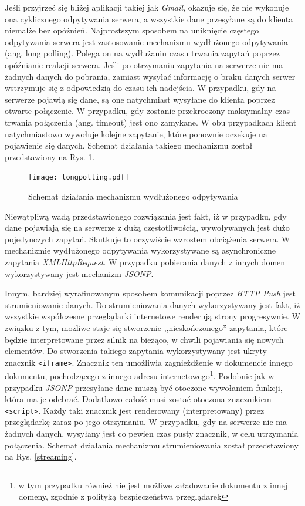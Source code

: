 \documentclass[a4paper,12pt]{article}
\providecommand{\imref}[1]{Rys. \ref{#1}} %
\begin{document}
Jeśli przyjrzeć się bliżej aplikacji takiej jak \emph{Gmail}, okazuje
się, że nie wykonuje ona cyklicznego odpytywania serwera, a wszystkie
dane przesyłane są do klienta niemalże bez opóźnień. Najprostszym
sposobem na uniknięcie częstego odpytywania serwera jest zastosowanie
mechanizmu wydłużonego odpytywania (ang. long polling). Polega on na
wydłużaniu czasu trwania zapytań poprzez opóźnianie reakcji
serwera. Jeśli po otrzymaniu zapytania na serwerze nie ma żadnych
danych do pobrania, zamiast wysyłać informację o braku danych serwer
wstrzymuje się z odpowiedzią do czasu ich nadejścia. W przypadku, gdy
na serwerze pojawią się dane, są one natychmiast wysyłane do klienta
poprzez otwarte połączenie. W przypadku, gdy zostanie przekroczony
maksymalny czas trwania połączenia (ang. timeout) jest ono zamykane. W
obu przypadkach klient natychmiastowo wywołuje kolejne zapytanie,
które ponownie oczekuje na pojawienie się danych. Schemat działania
takiego mechanizmu został przedstawiony na \imref{longpolling}.

\begin{figure}[ht]
  \begin{center}
    \texttt{[image: longpolling.pdf]}
  \end{center}
  \caption{Schemat działania mechanizmu wydłużonego odpytywania}
  \label{longpolling}
\end{figure}

Niewątpliwą wadą przedstawionego rozwiązania jest fakt, iż w
przypadku, gdy dane pojawiają się na serwerze z dużą częstotliwością,
wywoływanych jest dużo pojedynczych zapytań. Skutkuje to oczywiście
wzrostem obciążenia serwera. W mechanizmie wydłużonego odpytywania
wykorzystywane są asynchroniczne zapytania \emph{XMLHttpRequest}. W
przypadku pobierania danych z innych domen wykorzystywany jest
mechanizm \emph{JSONP}.

Innym, bardziej wyrafinowanym sposobem komunikacji poprzez \emph{HTTP
  Push} jest strumieniowanie danych. Do strumieniowania danych
wykorzystywany jest fakt, iż wszystkie współczesne przeglądarki
internetowe renderują strony progresywnie. W związku z tym, możliwe
staje się stworzenie ,,nieskończonego'' zapytania, które będzie
interpretowane przez silnik na bieżąco, w chwili pojawiania się nowych
elementów. Do stworzenia takiego zapytania wykorzystywany jest ukryty
znacznik \texttt{<iframe>}. Znacznik ten umożliwia zagnieżdżenie w
dokumencie innego dokumentu, pochodzącego z innego adresu
internetowego\footnote{w tym przypadku również nie jest możliwe
  załadowanie dokumentu z innej domeny, zgodnie z polityką
  bezpieczeństwa przeglądarek}. Podobnie jak w przypadku \emph{JSONP}
przesyłane dane muszą być otoczone wywołaniem funkcji, która ma je
odebrać. Dodatkowo całość musi zostać otoczona znacznikiem
\texttt{<script>}. Każdy taki znacznik jest renderowany
(interpretowany) przez przeglądarkę zaraz po jego otrzymaniu. W
przypadku, gdy na serwerze nie ma żadnych danych, wysyłany jest co
pewien czas pusty znacznik, w celu utrzymania połączenia. Schemat
działania mechanizmu strumieniowania został przedstawiony na
\imref{streaming}.
\end{document}
